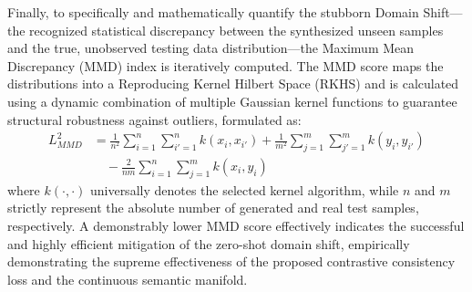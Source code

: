 Finally, to specifically and mathematically quantify the stubborn Domain Shift—the recognized statistical discrepancy between the synthesized unseen samples and the true, unobserved testing data distribution—the Maximum Mean Discrepancy (MMD) index is iteratively computed. The MMD score maps the distributions into a Reproducing Kernel Hilbert Space (RKHS) and is calculated using a dynamic combination of multiple Gaussian kernel functions to guarantee structural robustness against outliers, formulated as:
\begin{align}
    L_{MMD}^2 &= \frac{1}{n^2} \sum_{i=1}^{n} \sum_{i'=1}^{n} k(x_i, x_{i'}) + \frac{1}{m^2} \sum_{j=1}^{m} \sum_{j'=1}^{m} k(y_i, y_{i'}) \nonumber \\
    &\quad - \frac{2}{nm} \sum_{i=1}^{n} \sum_{j=1}^{m} k(x_i, y_i) \label{eq:mmd}
\end{align}
where $k(\cdot, \cdot)$ universally denotes the selected kernel algorithm, while $n$ and $m$ strictly represent the absolute number of generated and real test samples, respectively. A demonstrably lower MMD score effectively indicates the successful and highly efficient mitigation of the zero-shot domain shift, empirically demonstrating the supreme effectiveness of the proposed contrastive consistency loss and the continuous semantic manifold.
